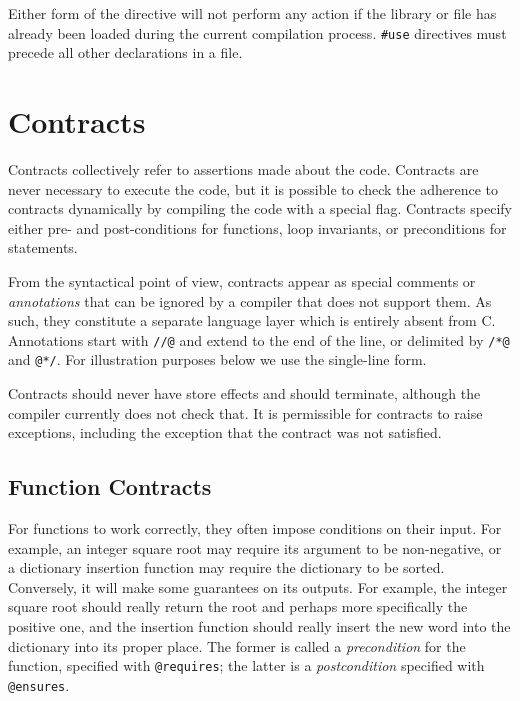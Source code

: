 \documentclass[11pt]{article}
\begin{document}
Either form of the directive will not perform any action if
the library or file has already been loaded during the current
compilation process.  \verb'#use' directives must precede all
other declarations in a file.

\section{Contracts}
\label{sec:contracts}

Contracts collectively refer to assertions made about the code.
Contracts are never necessary to execute the code, but it is possible
to check the adherence to contracts dynamically by compiling the code
with a special flag.  Contracts specify either pre- and post-conditions
for functions, loop invariants, or preconditions for statements.

From the syntactical point of view, contracts appear as special
comments or \emph{annotations} that can be ignored by a compiler that
does not support them.  As such, they constitute a separate language
layer which is entirely absent from C\@.  Annotations start with
\verb'//@' and extend to the end of the line, or delimited
by \verb'/*@' and \verb'@*/'.  For illustration purposes below
we use the single-line form.

Contracts should never have store effects and should terminate,
although the compiler currently does not check that.  It is
permissible for contracts to raise exceptions, including the exception
that the contract was not satisfied.

\subsection{Function Contracts}

For functions to work correctly, they often impose conditions on their
input.  For example, an integer square root may require its argument
to be non-negative, or a dictionary insertion function may require
the dictionary to be sorted.  Conversely, it will make some guarantees
on its outputs.  For example, the integer square root should really
return the root and perhaps more specifically the positive one, and
the insertion function should really insert the new word into the
dictionary into its proper place.  The former is called a
\emph{precondition} for the function, specified with \verb'@requires';
the latter is a \emph{postcondition} specified with \verb'@ensures'.
\end{document}
